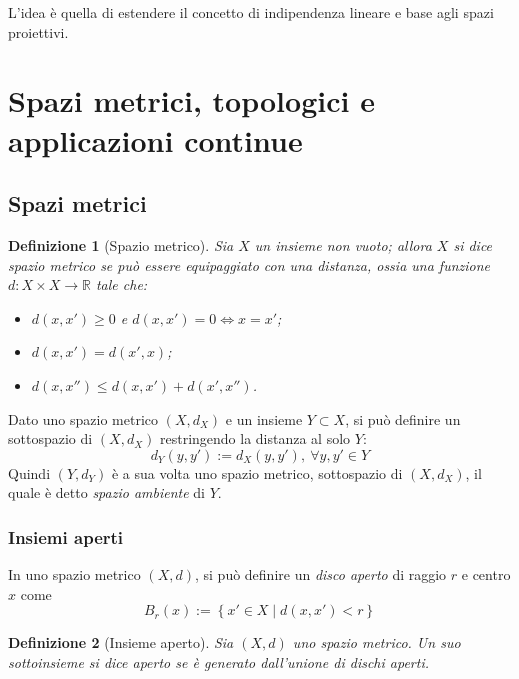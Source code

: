 \documentclass[11pt, a4paper]{scrartcl}
\theoremstyle{style1}
\newtheorem{definizione}{Definizione}[section]
\numberwithin{equation}{subsection}
\begin{document}
L'idea \`e quella di estendere il concetto di indipendenza lineare e base agli spazi proiettivi.




















\newpage
\section{Spazi metrici, topologici e applicazioni continue}
\subsection{Spazi metrici}
\begin{definizione}
	[Spazio metrico]
Sia $X$ un insieme non vuoto; allora $X$ si dice spazio metrico se pu\`o essere equipaggiato con una \textit{distanza}, ossia una funzione $d : X \times X \to \mathbb{R}$ tale che:
\begin{itemize}
	\item $d(x,x') \ge  0 $ e $d(x,x') = 0 \iff x=x'$;
	\item $d(x,x') = d(x',x)$;
	\item $d(x,x'') \le  d(x,x') + d(x',x'')$.
\end{itemize}
\end{definizione}
\noindent Dato uno spazio metrico $(X,d_X)$ e un insieme $Y \subset  X$, si pu\`o definire un sottospazio di $(X,d_X)$ restringendo la distanza al solo $Y$:
\[
d_Y (y,y') := d_X(y,y'), \ \forall y,y' \in Y
\] 
Quindi $(Y,d_Y)$ \`e a sua volta uno spazio metrico, sottospazio di $(X,d_X)$, il quale \`e detto \textit{spazio ambiente} di $Y$.
\subsubsection{Insiemi aperti}
In uno spazio metrico $(X,d)$, si pu\`o definire un \textit{disco aperto} di raggio $r$ e centro $x$ come
\[
B_r(x) := \left\{ x' \in X  \mid d(x,x') < r \right\} 
\] 
\begin{definizione}
	[Insieme aperto]
	Sia $(X,d)$ uno spazio metrico. Un suo sottoinsieme si dice aperto se \`e generato dall'unione di dischi aperti.
\end{definizione}
\end{document}
